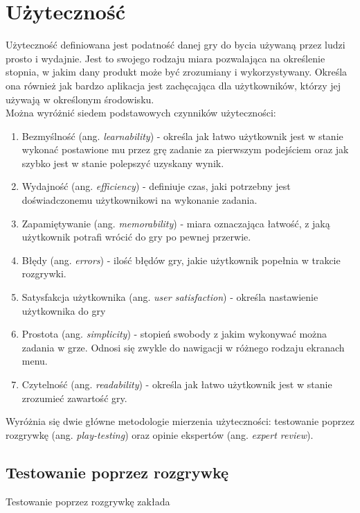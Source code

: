 \documentclass[a4paper,12pt,numbers=noenddot]{report}
\begin{document}
\section{Użyteczność}
Użyteczność definiowana jest podatność danej gry do bycia używaną przez ludzi prosto i wydajnie.\cite{art_Usability} Jest to swojego rodzaju miara pozwalająca na określenie stopnia, w jakim dany produkt może być zrozumiany i wykorzystywany. Określa ona również jak bardzo aplikacja jest zachęcająca dla użytkowników, którzy jej używają w określonym środowisku. \cite{art_evaluationOfMGevaluationSystem} 
\\
Można wyróżnić siedem podstawowych czynników użyteczności: \cite{art_UsabilityEvaluationSystematicReview}
\begin{enumerate}
\item Bezmyślność (ang. \textit{learnability}) - określa jak łatwo użytkownik jest w stanie wykonać postawione mu przez grę zadanie za pierwszym podejściem oraz jak szybko jest w stanie polepszyć uzyskany wynik.
\item Wydajność (ang. \textit{efficiency}) - definiuje czas, jaki potrzebny jest doświadczonemu użytkownikowi na wykonanie zadania.
\item Zapamiętywanie (ang. \textit{memorability}) - miara oznaczająca łatwość, z jaką użytkownik potrafi wrócić do gry po pewnej przerwie.
\item Błędy (ang. \textit{errors}) - ilość błędów gry, jakie użytkownik popełnia w trakcie rozgrywki.
\item Satysfakcja użytkownika (ang. \textit{user satisfaction}) - określa nastawienie użytkownika do gry
\item Prostota (ang. \textit{simplicity}) - stopień swobody z jakim wykonywać można zadania w grze. Odnosi się zwykle do nawigacji w różnego rodzaju ekranach menu.
\item Czytelność (ang. \textit{readability}) - określa jak łatwo użytkownik jest w stanie zrozumieć zawartość gry.
\end{enumerate}

Wyróżnia się dwie główne metodologie mierzenia użyteczności: testowanie poprzez rozgrywkę (ang. \textit{play-testing}) oraz opinie ekspertów (ang. \textit{expert review}).

\subsection{Testowanie poprzez rozgrywkę}
Testowanie poprzez rozgrywkę zakłada
\end{document}
